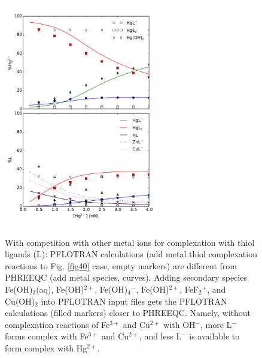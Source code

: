 \documentclass[12pt, a4paper]{article}
\begin{document}
\newpage
\begin{figure}[ht]
\centering
\includegraphics[width=0.6\textwidth]{../pflotran/speciation/Dong2010/ex4/ex4.pdf}
\caption{
With competition with other metal ions for complexation with thiol ligands (L):
PFLOTRAN calculations (add metal thiol complexation reactions to Fig. \ref{fig40} case, empty markers)
are different from PHREEQC (add metal species, curves). Adding secondary species Fe(OH)$_3$(aq),
Fe(OH)$^{2+}$, Fe(OH)${_4}{^-}$, Fe(OH)$^{2+}$, FeF${_2}{^+}$, and Cu(OH)$_2$ into
PFLOTRAN input files gets the PFLOTRAN calculations (filled markers) closer to
PHREEQC. Namely, without complexation reactions of Fe$^{3+}$ and Cu$^{2+}$ with
OH$^-$, more L$^-$ forms complex with Fe$^{3+}$ and Cu$^{2+}$, and less L$^-$
is available to form complex with Hg$^{2+}$.
}
\label{fig4}
\end{figure}


\clearpage
%
%
%
\end{document}

